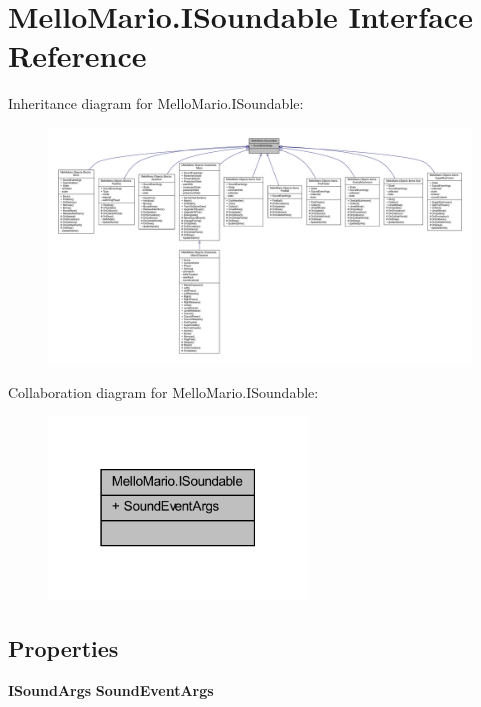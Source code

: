\section{Mello\+Mario.\+I\+Soundable Interface Reference}
\label{interfaceMelloMario_1_1ISoundable}


Inheritance diagram for Mello\+Mario.\+I\+Soundable\+:
\nopagebreak
\begin{figure}[H]
\begin{center}
\leavevmode
\includegraphics[width=350pt]{interfaceMelloMario_1_1ISoundable__inherit__graph}
\end{center}
\end{figure}


Collaboration diagram for Mello\+Mario.\+I\+Soundable\+:
\nopagebreak
\begin{figure}[H]
\begin{center}
\leavevmode
\includegraphics[width=195pt]{interfaceMelloMario_1_1ISoundable__coll__graph}
\end{center}
\end{figure}
\subsection*{Properties}
\begin{DoxyCompactItemize}
\item 
\textbf{ I\+Sound\+Args} \textbf{ Sound\+Event\+Args}\hspace{0.3cm}{\ttfamily  [get]}
\end{DoxyCompactItemize}
